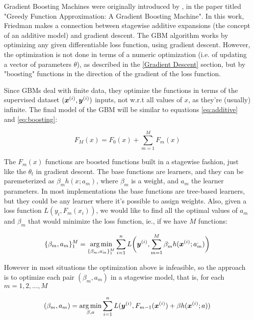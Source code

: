 Gradient Boosting Machines were originally introduced by \cite{gbmdef}, in the paper titled "Greedy Function Approximation: A Gradient Boosting Machine". In this work, Friedman makes a connection between stagewise additive expansions (the concept of an additive model) and gradient descent. The GBM algorithm works by optimizing any given differentiable loss function, using gradient descent. However, the optimization is not done in terms of a numeric optimization (i.e. of updating a vector of parameters $\theta$), as described in the \ref{Gradient Descent} section, but by "boosting" functions in the direction of the gradient of the loss function.

Since GBMs deal with finite data, they optimize the functions in terms of the supervised dataset $(\bm{x}^{(i)},\bm{y}^{(i)})$ inputs, not w.r.t all values of $x$, as they're (usually) infinite. The final model of the GBM will be similar to equations \ref{eq:additive} and \ref{eq:boosting}:

\begin{equation}\label{eq:gbm-1}
    F_M(x) = F_0(x) + \sum_{m=1}^M F_m(x)
\end{equation}

The $F_m(x)$ functions are boosted functions built in a stagewise fashion, just like the $\theta_t$ in gradient descent. The base functions are learners, and they can be paremeterized as $\beta_mh(x;a_m)$, where $\beta_m$ is a weight, and $a_m$ the learner parameters. In most implementations the base functions are tree-based learners, but they could be any learner where it's possible to assign weights. Also, given a loss function $L(y_i, F_m(x_i))$, we would like to find all the optimal values of $a_m$ and $\beta_m$ that would minimize the loss function, ie., if we have $M$ functions:

\begin{equation*}
\{\beta_m, a_m\}_1^M = \argmin_{\{\beta_m^\apsimple, a_m^\apsimple\}_1^M} \sum_{i=1}^n L\bigg(\yisup, \sum_{m=1}^M \beta_m^\apsimple h(\xisup;a_m^\apsimple)\bigg)
\end{equation*}

However in most situations the optimization above is infeasible, so the  approach is to optimize each pair $(\beta_m, a_m)$ in a stagewise model, that is, for each $m = 1, 2, ..., M$

\begin{equation*}
    (\beta_m, a_m) = \operatorname*{arg\,min}_{\beta, a} \sum_{i=1}^n L(\bm{y}^{(i)}, F_{m-1}(\bm{x}^{(i)}) + \beta h(\bm{x}^{(i)}; a))
\end{equation*}

